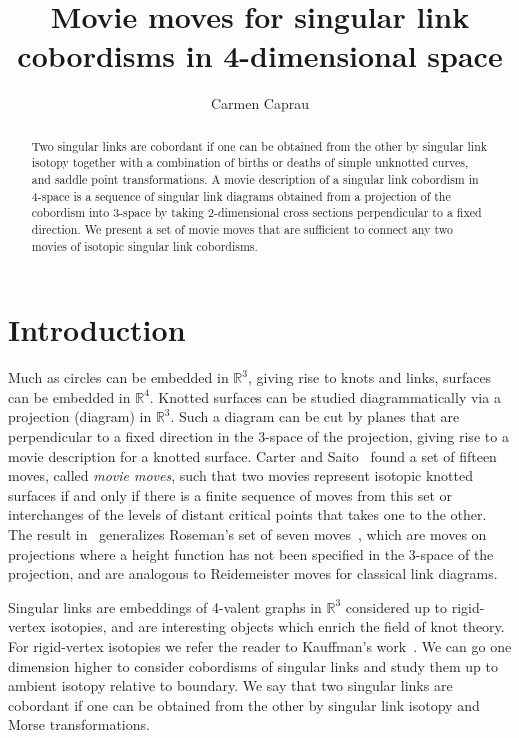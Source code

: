 \documentclass{amsart}\usepackage{amsfonts, amsmath, amssymb}\usepackage{graphicx, epic, epsf, enumerate, stmaryrd}
\theoremstyle{definition}
\numberwithin{equation}{section}
\begin{document}
\title{Movie moves for singular link cobordisms in 4-dimensional space}

\author{Carmen Caprau}
\address{Department of Mathematics, California State University, Fresno, CA 93740, USA}
\urladdr{}

\date{}

\begin{abstract}
Two singular links are cobordant if one can be obtained from the other by singular link isotopy together with a combination of births or deaths of simple unknotted curves, and saddle point transformations. A movie description of a singular link cobordism in 4-space is a sequence of singular link diagrams obtained from a projection of the cobordism into 3-space by taking 2-dimensional cross sections perpendicular to a fixed direction.
We present a set of movie moves that are sufficient to connect any two movies of isotopic singular link cobordisms.
\end{abstract}
\maketitle

\section{Introduction}\label{sec:intro}
Much as circles can be embedded in ${\mathbb{R}}^3$, giving rise to knots and links, surfaces can be embedded in ${\mathbb{R}}^4$. Knotted surfaces can be studied diagrammatically via a projection (diagram) in ${\mathbb{R}}^3$. Such a diagram can be cut by planes that are perpendicular to a fixed direction in the 3-space of the projection, giving rise to a movie description for a knotted surface.
Carter and Saito~\cite{CS} found a set of fifteen moves, called \textit{movie moves}, such that two movies represent isotopic knotted surfaces if and only if there is a finite sequence of moves from this set or interchanges of the levels of distant critical points that takes one to the other. The result in~\cite{CS} generalizes Roseman's set of seven moves~\cite{Ros}, which are moves on projections where a height function has not been specified in the 3-space of the projection, and are analogous to Reidemeister moves for classical link diagrams. 

Singular links are embeddings of 4-valent graphs in ${\mathbb{R}}^3$ considered up to rigid-vertex isotopies, and are interesting objects which enrich the field of knot theory. For rigid-vertex isotopies we refer the reader to Kauffman's work~\cite{Ka1, Ka2}.  We can go one dimension higher to consider cobordisms of singular links and study them up to ambient isotopy relative to boundary. We say that two singular links are cobordant if one can be obtained from the other by singular link isotopy and Morse transformations.
\end{document}
